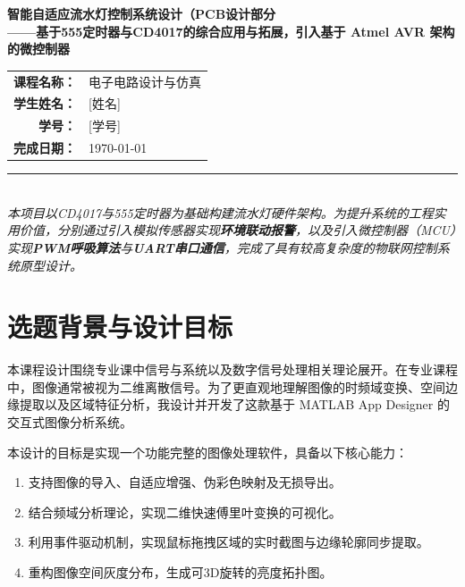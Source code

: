 \documentclass[12pt, a4paper]{article}
\begin{document}
\begin{titlepage}
    \begin{center}
        \vspace*{2cm}
        \Huge{\textbf{智能自适应流水灯控制系统设计（PCB设计部分}}\\
        \vspace{0.5cm}
        \Large{\textbf{——基于555定时器与CD4017的综合应用与拓展，引入基于 Atmel AVR 架构的微控制器}}\\
        \vspace{2cm}
        
        \large
        \begin{tabular}{rl}
            \textbf{课程名称：} & 电子电路设计与仿真 \\
            \textbf{学生姓名：} & [姓名] \\  %
            \textbf{学号：} & [学号] \\      %
            \textbf{完成日期：} & \today \\
        \end{tabular}
        \vspace{3cm}
        
        \rule{0.8\textwidth}{0.5pt} \\
        \vspace{0.5cm}
        \textit{本项目以CD4017与555定时器为基础构建流水灯硬件架构。为提升系统的工程实用价值，分别通过引入模拟传感器实现\textbf{环境联动报警}，以及引入微控制器（MCU）实现\textbf{PWM呼吸算法}与\textbf{UART串口通信}，完成了具有较高复杂度的物联网控制系统原型设计。}
    \end{center}
\end{titlepage}

\newpage
\newpage

\section{选题背景与设计目标}
本课程设计围绕专业课中信号与系统以及数字信号处理相关理论展开。在专业课程中，图像通常被视为二维离散信号。为了更直观地理解图像的时频域变换、空间边缘提取以及区域特征分析，我设计并开发了这款基于 MATLAB App Designer 的交互式图像分析系统。

本设计的目标是实现一个功能完整的图像处理软件，具备以下核心能力：
\begin{enumerate}
    \item 支持图像的导入、自适应增强、伪彩色映射及无损导出。
    \item 结合频域分析理论，实现二维快速傅里叶变换的可视化。
    \item 利用事件驱动机制，实现鼠标拖拽区域的实时截图与边缘轮廓同步提取。
    \item 重构图像空间灰度分布，生成可3D旋转的亮度拓扑图。
\end{enumerate}
\end{document}
